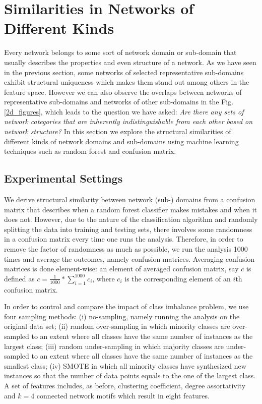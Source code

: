 \section{Similarities in Networks of Different Kinds}
Every network belongs to some sort of network domain or sub-domain that usually describes the properties and even structure of a network. As we have seen in the previous section, some networks of selected representative sub-domains exhibit structural uniqueness which makes them stand out among others in the feature space. However we can also observe the overlaps between networks of representative sub-domains and networks of other sub-domains in the Fig. \ref{2d_figures}, which leads to the question we have asked:  \textit{Are there any sets of network categories that are inherently indistinguishable from each other based on network structure?} In this section we explore the structural similarities of different kinds of network domains and sub-domains using machine learning techniques such as random forest and confusion matrix.  

\subsection{Experimental Settings}
We derive structural similarity between network (sub-) domains from a confusion matrix that describes when a random forest classifier makes mistakes and when it does not. However, due to the nature of the classification algorithm and randomly splitting the data into training and testing sets, there involves some randomness in a confusion matrix every time one runs the analysis. Therefore, in order to remove the factor of randomness as much as possible, we run the analysis 1000 times and average the outcomes, namely confusion matrices. Averaging confusion matrices is done element-wise: an element of averaged confusion matrix, say $c$ is defined as $c = \frac{1}{1000}*\sum_{i=1}^{1000} c_i$, where $c_i$ is the corresponding element of an $i$th confusion matrix.

In order to control and compare the impact of class imbalance problem, we use four sampling methods: (i) no-sampling, namely running the analysis on the original data set; (ii) random over-sampling in which minority classes are over-sampled to an extent where all classes have the same number of instances as the largest class; (iii) random under-sampling in which majority classes are under-sampled to an extent where all classes have the same number of instances as the smallest class; (iv) SMOTE in which all minority classes have synthesized new instances so that the number of data points equals to the one of the largest class. A set of features includes, as before, clustering coefficient, degree assortativity and $k = 4$ connected network motifs which result in eight features.
 
